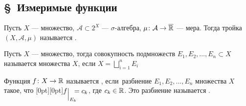 \subsection*{\S\ Измеримые функции}

\begin{opr}
	Пусть $X$ --- множество, $\mathcal A \subset 2^X$ --- $\sigma$-алгебра, $\mu \colon \mathcal A \to \overline{\mathbb R}$ --- мера. Тогда тройка $(X, \mathcal A, \mu)$ называется .
\end{opr}

\begin{opr}
	Пусть $X$ --- множество, тогда совокупность подмножеств $E_1, E_2, \ldots, E_n \subset X$ называется  множества $X$, если $X = \bigsqcup\limits_{i = 1}^n E_i$
\end{opr}

\begin{opr}\label{ступ.ф.}
	Функция $f \colon X \to \mathbb R$  называется , если\E\ разбиение $E_1, E_2, \ldots, E_n$ множества $X$ такое, что  \raisebox{0pt}[0pt][0pt]{$f \su{E_k} = c_k$}, где $c_k \in \mathbb R$. Это разбиение называется .
\end{opr}


